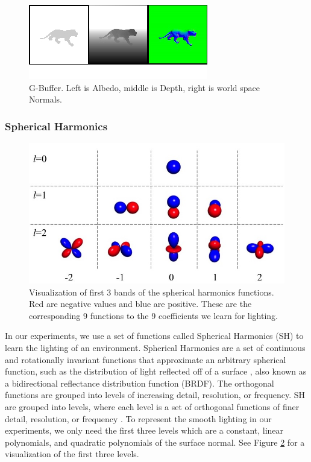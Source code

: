 \documentclass[10pt,twocolumn,letterpaper]{article}
\begin{document}
\begin{figure}[h!]
\centering
\includegraphics[width=0.8\columnwidth]{./assets/gbuffer-onerow.png}
\caption{G-Buffer. Left is Albedo, middle is Depth, right is world space Normals.}
\label{fig:GBUFFER_ALBEDO} 
\end{figure}

\subsubsection{Spherical Harmonics}
\begin{figure}[h!]
\centering
\includegraphics[width=1.0\columnwidth]{./assets/SH_Fig.jpg}
\caption{Visualization of first 3 bands of the spherical harmonics functions. Red are negative values and blue are positive. These are the corresponding 9 functions to the 9 coefficients we learn for lighting.}
\label{fig:SHBands01}
\end{figure}

In our experiments, we use a set of functions called Spherical Harmonics (SH) to learn the lighting of an environment. Spherical Harmonics are a set of continuous and rotationally invariant functions that approximate an arbitrary spherical function, such as the distribution of light reflected off of a surface \cite{Ramamoorthi:2001:ERI:383259.383317}, also known as a bidirectional reflectance distribution function (BRDF). The orthogonal functions are grouped into levels of increasing detail, resolution, or frequency. SH are grouped into levels, where each level is a set of orthogonal functions of finer detail, resolution, or frequency \cite{Shreiner:2013:OPG:2544032}.  To represent the smooth lighting in our experiments, we only need the first three levels which are a constant, linear polynomials, and quadratic polynomials of the surface normal. See Figure \ref{fig:SHBands01} for a visualization of the first three levels.
\end{document}
